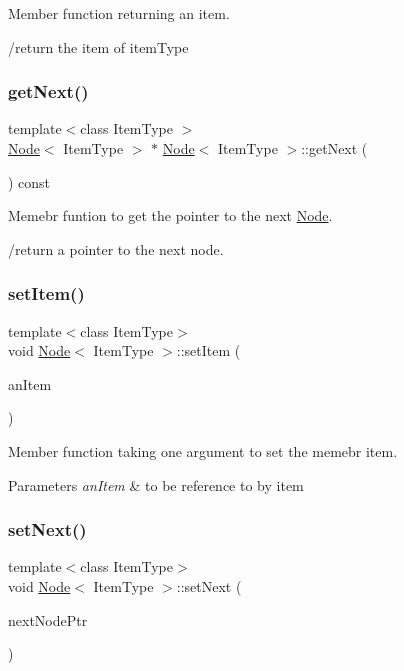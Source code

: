 Member function returning an item. 

/return the item of item\+Type \mbox{\label{classNode_a3eb0c96e03a3fd46ea1cff4c305bbedd}} 
\subsubsection{\texorpdfstring{get\+Next()}{getNext()}}
{\footnotesize\ttfamily template$<$class Item\+Type $>$ \\
\hyperlink{classNode}{Node}$<$ Item\+Type $>$ $\ast$ \hyperlink{classNode}{Node}$<$ Item\+Type $>$\+::get\+Next (\begin{DoxyParamCaption}{ }\end{DoxyParamCaption}) const}



Memebr funtion to get the pointer to the next \hyperlink{classNode}{Node}. 

/return a pointer to the next node. \mbox{\label{classNode_ab4ceecdecc5df799011de486b9f54974}} 
\subsubsection{\texorpdfstring{set\+Item()}{setItem()}}
{\footnotesize\ttfamily template$<$class Item\+Type$>$ \\
void \hyperlink{classNode}{Node}$<$ Item\+Type $>$\+::set\+Item (\begin{DoxyParamCaption}\item[{const Item\+Type \&}]{an\+Item }\end{DoxyParamCaption})}



Member function taking one argument to set the memebr item. 


\begin{DoxyParams}{Parameters}
{\em an\+Item} & to be reference to by item \\
\hline
\end{DoxyParams}
\mbox{\label{classNode_a01c1a66d4e39f5b149e090413deb4633}} 
\subsubsection{\texorpdfstring{set\+Next()}{setNext()}}
{\footnotesize\ttfamily template$<$class Item\+Type$>$ \\
void \hyperlink{classNode}{Node}$<$ Item\+Type $>$\+::set\+Next (\begin{DoxyParamCaption}\item[{\hyperlink{classNode}{Node}$<$ Item\+Type $>$ $\ast$}]{next\+Node\+Ptr }\end{DoxyParamCaption})}



